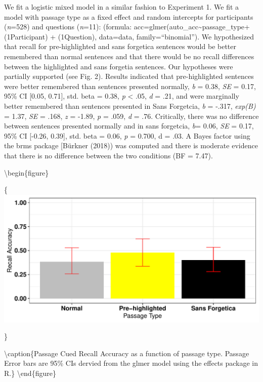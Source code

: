 \documentclass[english,doc]{apa6}
\begin{document}
We fit a logistic mixed model in a similar fashion to Experiment 1. We fit a model with passage type as a fixed effect and random intercepts for participants (\emph{n}=528) and questions (\emph{n}=11): (formula: acc=glmer(auto\_acc\textasciitilde{}passage\_type+(1\textbar{}Participant) + (1\textbar{}Question), data=data, family=\enquote{binomial}). We hypothesized that recall for pre-highlighted and sans forgetica sentences would be better remembered than normal sentences and that there would be no recall differences between the highlighted and sans forgetia sentences. Our hypotheses were partially supported (see Fig. 2). Results indicated that pre-highlighted sentences were better remembered than sentences presented normally, \emph{b} = 0.38, \emph{SE} = 0.17, 95\% CI {[}0.05, 0.71{]}, std. beta = 0.38, \emph{p} \textless{} .05, \emph{d} = .21, and were marginally better remembered than sentences presented in Sans Forgetcia, \emph{b} = -.317, \emph{exp(B)} = 1.37, \emph{SE} = .168, \emph{z} = -1.89, \emph{p} = .059, \emph{d} = .76. Critically, there was no difference between sentences presented normally and in sans forgetcia, \emph{b}= 0.06, \emph{SE} = 0.17, 95\% CI {[}-0.26, 0.39{]}, std. beta = 0.06, \emph{p} = 0.700, d = .03. A Bayes factor using the brms package {[}Bürkner (2018)) was computed and there is moderate evidence that there is no difference between the two conditions (BF = 7.47).

\textbackslash{}begin\{figure\}

\{\centering \includegraphics{SF_Paper_files/figure-latex/unnamed-chunk-3-1}

\}

\textbackslash{}caption\{Passage Cued Recall Accuracy as a function of passage type. Passage Error bars are 95\% CIs dervied from the glmer model using the effects package in R.\}\label{fig:unnamed-chunk-3}
\textbackslash{}end\{figure\}
\end{document}
